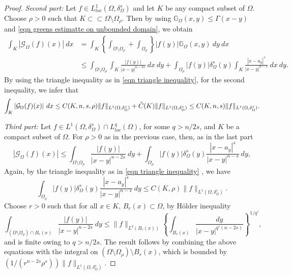 \documentclass{amsart}
\newcommand{\g}[1]{\mathcal{G}_{#1}}
\newcommand{\gk}[1]{\mathbb{G}_{#1}}
\begin{document}
\begin{proof}
    \textit{Second part:}
    Let $f\in L^{1}_{loc}(\Omega,\delta_{\Omega}^{s})$ and let $K$ be any compact subset of $\Omega$. Choose $\rho>0$ such that $K\subset\subset \Omega\setminus\Omega_{\rho}$. Then by using $\gk{\Omega}(x,y)\leq \Gamma(x-y)$ and \eqref{eqn greens estimatte on unbounded domain}, we obtain
    \begin{equation*}
        \begin{split}
            \int_{K}|\g{\Omega}(f)(x)|\ dx&=\int_{K}\left\{\int_{\Omega\setminus\Omega_{\rho}}+\int_{\Omega_{\rho}}\right\}|f(y)|\gk{\Omega}(x,y)\ dy\ dx\\
            &\leq \int_{\Omega\setminus\Omega_{\rho}}\int_{K}\frac{|f(y)|}{|x-y|^{n-2s}}\ dx\ dy+\int_{\Omega_{\rho}}|f(y)|\delta_{\Omega}^{s}(y)\int_{K}\frac{|x-a_y|^{s}}{|x-y|^{n-s}}\ dx \ dy.
        \end{split}
    \end{equation*}
    By using the triangle inequality as in \eqref{eqn triangle inequality}, for the second inequality, we infer that
    \begin{equation*}
        \int_{K}|\g{\Omega}(f)(x)|\ dx\leq C(K,n,s,\rho)\|f\|_{L^{1}(\Omega,\delta_{\Omega}^{s})}+\Tilde{C}(K)\|f\|_{L^{1}(\Omega,\delta_{\Omega}^{s})}\leq C(K,n,s)\|f\|_{L^{1}(\Omega,\delta_{\Omega}^{s})}.
    \end{equation*}

    \textit{Third part:} Let $f\in L^{1}(\Omega,\delta_{\Omega}^{s})\cap L_{loc}^{q}(\Omega)$, for some $q>n/2s$, and $K$ be a compact subset of $\Omega$. For $\rho>0$ as in the previous case, then, as in the last part
    \begin{equation*}
        |\g{\Omega}(f)(x)| \leq \int_{\Omega\setminus\Omega_{\rho}}\frac{|f(y)|}{|x-y|^{n-2s}}\ dy+\int_{\Omega_{\rho}}|f(y)|\delta_{\Omega}^{s}(y)\frac{|x-a_y|^{s}}{|x-y|^{n-s}} \ dy,
    \end{equation*}
    Again, by the triangle inequality as in \eqref{eqn triangle inequality} %
    , we have
    \begin{equation*}
        \int_{\Omega_{\rho}}|f(y)|\delta_{\Omega}^{s}(y)\frac{|x-a_y|^{s}}{|x-y|^{n-s}} \ dy\leq C(K,\rho)\|f\|_{L^{1}(\Omega,\delta^{s}_{\Omega})}.
    \end{equation*}
    Choose $r>0$ such that for all $x\in K$, $B_{r}(x)\subset\Omega$, by H\"older inequality
    \begin{equation*}
        \int_{(\Omega\setminus\Omega_{\rho})\cap B_{r}(x)}\frac{|f(y)|}{|x-y|^{n-2s}}\ dy\leq \|f\|_{L^{q}(B_{r}(x))}\left\{\int_{B_{r}(x)}\frac{dy}{|x-y|^{q'(n-2s)}}\right\}^{1/q'},
    \end{equation*}
    and is finite owing to $q>n/2s$. The result follows by combining the above equations with the integral on $(\Omega\setminus\Omega_{\rho})\setminus B_{r}(x)$, which is bounded by $\left(1/(r^{n-2s}\rho^{s})\right)\|f\|_{L^{1}(\Omega,\delta_{\Omega}^{s})}$.
\end{proof}
\end{document}
